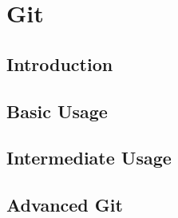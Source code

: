 \chapter{Git}
\section{Introduction}

\section{Basic Usage}







\section{Intermediate Usage}












\section{Advanced Git}














